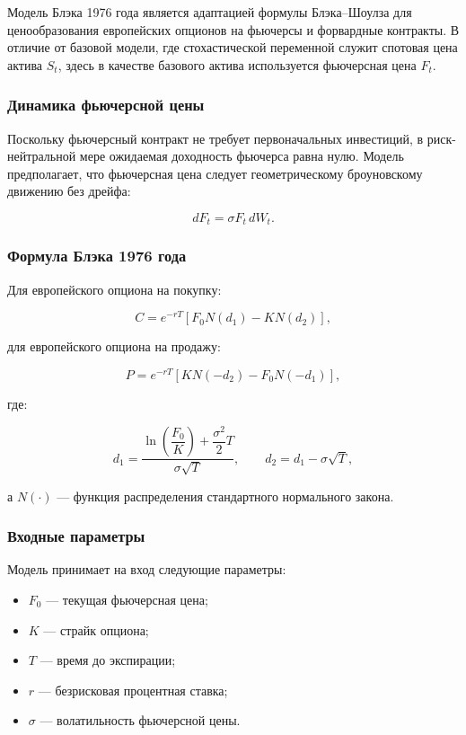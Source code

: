 \documentclass[11pt,a4paper]{article}
\begin{document}
Модель Блэка 1976 года является адаптацией формулы Блэка--Шоулза для ценообразования европейских опционов на фьючерсы и форвардные контракты. В отличие от базовой модели, где стохастической переменной служит спотовая цена актива $S_t$, здесь в качестве базового актива используется фьючерсная цена $F_t$.

\subsubsection{Динамика фьючерсной цены}

Поскольку фьючерсный контракт не требует первоначальных инвестиций, в риск-нейтральной мере ожидаемая доходность фьючерса равна нулю. Модель предполагает, что фьючерсная цена следует геометрическому броуновскому движению без дрейфа:

\begin{equation}
dF_t = \sigma F_t\, dW_t.
\end{equation}

\subsubsection{Формула Блэка 1976 года}

Для европейского опциона на покупку:

\begin{equation}
C = e^{-rT}\!\left[F_0 N(d_1) - K N(d_2)\right],
\end{equation}

для европейского опциона на продажу:

\begin{equation}
P = e^{-rT}\!\left[K N(-d_2) - F_0 N(-d_1)\right],
\end{equation}

где:

\begin{equation}
d_1 = \frac{\ln\!\left(\dfrac{F_0}{K}\right) + \dfrac{\sigma^2}{2}T}{\sigma\sqrt{T}},
\qquad
d_2 = d_1 - \sigma\sqrt{T},
\end{equation}

а $N(\cdot)$ --- функция распределения стандартного нормального закона.

\subsubsection{Входные параметры}

Модель принимает на вход следующие параметры:

\begin{itemize}
    \item $F_0$ --- текущая фьючерсная цена;
    \item $K$ --- страйк опциона;
    \item $T$ --- время до экспирации;
    \item $r$ --- безрисковая процентная ставка;
    \item $\sigma$ --- волатильность фьючерсной цены.
\end{itemize}
\end{document}
